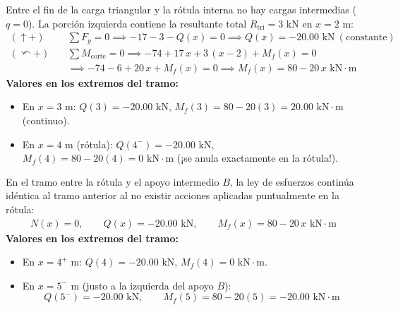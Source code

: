 Entre el fin de la carga triangular y la rótula interna no hay cargas intermedias ($q = 0$). La porción izquierda contiene la resultante total $R_{\text{tri}} = 3\text{ kN}$ en $x = 2\text{ m}$:
\begin{align*}
    (\uparrow +) \quad &\sum F_y = 0 \implies -17 - 3 - Q(x) = 0 \implies \boxed{Q(x) = -20.00\text{ kN}} \ (\text{constante}) \\
    (\curvearrowleft +) \quad &\sum M_{\text{corte}} = 0 \implies -74 + 17\,x + 3\,(x - 2) + M_f(x) = 0 \\
    &\implies -74 - 6 + 20\,x + M_f(x) = 0 \implies \boxed{M_f(x) = 80 - 20\,x\text{ kN}\cdot\text{m}}
\end{align*}
\textbf{Valores en los extremos del tramo:}
\begin{itemize}
    \item En $x = 3\text{ m}$: $Q(3) = -20.00\text{ kN}$, \quad $M_f(3) = 80 - 20(3) = 20.00\text{ kN}\cdot\text{m}$ (continuo).
    \item En $x = 4\text{ m}$ (rótula): $Q(4^-) = -20.00\text{ kN}$, \quad $M_f(4) = 80 - 20(4) = 0\text{ kN}\cdot\text{m}$ (¡se anula exactamente en la rótula!).
\end{itemize}

En el tramo entre la rótula y el apoyo intermedio $B$, la ley de esfuerzos continúa idéntica al tramo anterior al no existir acciones aplicadas puntualmente en la rótula:
\begin{align*}
    \boxed{N(x) = 0}, \qquad \boxed{Q(x) = -20.00\text{ kN}}, \qquad \boxed{M_f(x) = 80 - 20\,x\text{ kN}\cdot\text{m}}
\end{align*}
\textbf{Valores en los extremos del tramo:}
\begin{itemize}
    \item En $x = 4^+\text{ m}$: $Q(4) = -20.00\text{ kN}$, \quad $M_f(4) = 0\text{ kN}\cdot\text{m}$.
    \item En $x = 5^-\text{ m}$ (justo a la izquierda del apoyo $B$):
    \[
        Q(5^-) = -20.00\text{ kN}, \qquad M_f(5) = 80 - 20(5) = -20.00\text{ kN}\cdot\text{m}
    \]
\end{itemize}

